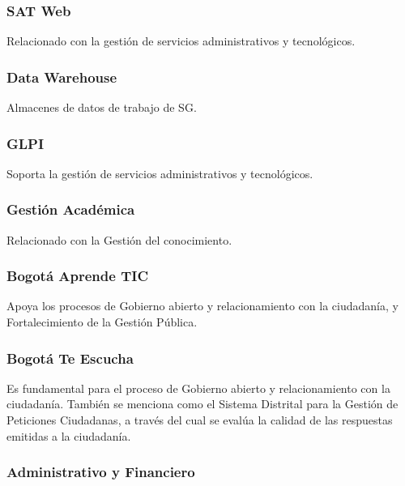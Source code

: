\documentclass[
	a4paper, %
	12pt, %
]{include/CSSullivanBusinessReport}
\begin{document}
\subsubsection{SAT Web}\label{sec:sat-web}

Relacionado con la gestión de servicios administrativos y tecnológicos.

\subsubsection{Data Warehouse}\label{sec:data-warehouse}

Almacenes de datos de trabajo de SG.

\subsubsection{GLPI}\label{sec:glpi}

Soporta la gestión de servicios administrativos y tecnológicos.

\subsubsection{Gestión Académica}\label{sec:gestiuxf3n-acaduxe9mica}

Relacionado con la Gestión del conocimiento.

\subsubsection{Bogotá Aprende TIC}\label{sec:bogotuxe1-aprende-tic}

Apoya los procesos de Gobierno abierto y relacionamiento con la
ciudadanía, y Fortalecimiento de la Gestión Pública.

\subsubsection{Bogotá Te Escucha}\label{sec:bogotuxe1-te-escucha}

Es fundamental para el proceso de Gobierno abierto y relacionamiento con
la ciudadanía. También se menciona como el Sistema Distrital para la
Gestión de Peticiones Ciudadanas, a través del cual se evalúa la calidad
de las respuestas emitidas a la ciudadanía.

\subsubsection{Administrativo y
Financiero}\label{sec:administrativo-y-financiero}
\end{document}

